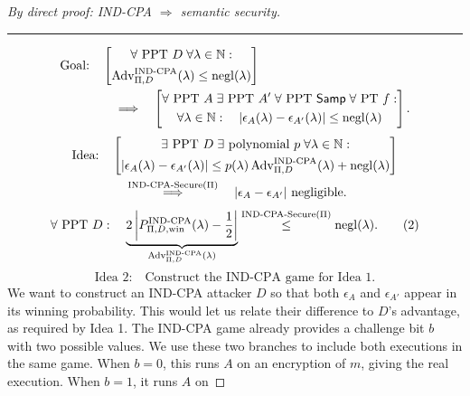 \documentclass[12pt,a4paper]{article}
\begin{document}
\begin{proof}[By direct proof: IND-CPA $\Longrightarrow$ semantic security]
\leavevmode\par\smallskip\hrule\medskip
\[
\begin{aligned}
\text{Goal:}\quad
&\left[\begin{gathered}
\forall\text{ PPT }D\;
\forall\lambda\in\mathbb{N}:\\
\mathrm{Adv}^{\mathrm{IND\text{-}CPA}}_{\Pi,D}(\lambda)\leq\operatorname{negl}(\lambda)
\end{gathered}\right]\\
&\quad\Longrightarrow\quad
\left[\begin{gathered}
\forall\text{ PPT }A\;\exists\text{ PPT }A'\;
\forall\text{ PPT }\mathsf{Samp}\;\forall\text{ PT }f:\\
\forall\lambda\in\mathbb{N}:\quad
|\epsilon_A(\lambda)-\epsilon_{A'}(\lambda)|\leq\operatorname{negl}(\lambda)
\end{gathered}\right].
\end{aligned}
\]
\[
\begin{aligned}
\text{Idea:}\quad
&\left[\begin{gathered}
\exists\text{ PPT }D\;\exists\text{ polynomial }p\;
\forall\lambda\in\mathbb{N}:\\
|\epsilon_A(\lambda)-\epsilon_{A'}(\lambda)|
\leq p(\lambda)\,\mathrm{Adv}^{\mathrm{IND\text{-}CPA}}_{\Pi,D}(\lambda)
+\operatorname{negl}(\lambda)
\end{gathered}\right]\\
&\quad\overset{\mathrm{IND\text{-}CPA\text{-}Secure}(\Pi)}{\Longrightarrow}\quad
|\epsilon_A-\epsilon_{A'}|\text{ negligible}.
\end{aligned}
\]
\renewcommand{\qedsymbol}{}
\[
\forall\text{ PPT }D:\quad
\underbrace{2\left|P_{\Pi,D,\mathrm{win}}^{\mathrm{IND\text{-}CPA}}(\lambda)-\frac12\right|}_{\mathrm{Adv}_{\Pi,D}^{\mathrm{IND\text{-}CPA}}(\lambda)}
\overset{\mathrm{IND\text{-}CPA\text{-}Secure}(\Pi)}{\leq}\operatorname{negl}(\lambda).
\tag{2}\label{eq:indcpa-negligible-bound}
\]
\[
\text{Idea 2:}\quad\text{Construct the IND-CPA game for Idea 1.}
\]
We want to construct an IND-CPA attacker $D$ so that both
$\epsilon_A$ and $\epsilon_{A'}$ appear in its winning probability.
This would let us relate their difference to $D$'s advantage, as required
by Idea 1. The IND-CPA game already provides a challenge bit $b$ with
two possible values. We use these two branches to include both executions
in the same game. When $b=0$, this runs $A$ on an
encryption of $m$, giving the real execution. When $b=1$, it runs $A$ on

\end{proof}
\end{document}

